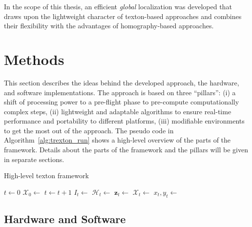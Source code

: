 \documentclass[11pt]{report}
\begin{document}
In the scope of this thesis, an efficient \emph{global} localization
was developed that draws upon the lightweight character of
texton-based approaches and combines their flexibility with the
advantages of homography-based approaches.

\chapter{Methods}
\label{chap:methods}

This section describes the ideas behind the developed approach, the
hardware, and software implementations.
The approach is based on three ``pillars'': (i) a shift of processing
power to a pre-flight phase to pre-compute computationally complex
steps, (ii) lightweight and adaptable algorithms to ensure real-time
performance and portability to different platforms, (iii) modifiable
environments to get the most out of the approach. The pseudo code in
Algorithm~\ref{alg:trexton_run} shows a high-level overview of the
parts of the framework. Details about the parts of the framework and
the pillars will be given in separate sections.
\begin{algorithm}
    \caption{High-level texton framework}
    \label{alg:trexton_run}
    \begin{algorithmic}[1]
      \State $t \gets 0$
      \State $\mathcal{X}_0 \gets$ 
       \State $t \gets t+1$ \State
      $I_t \gets$  \State
      $\mathcal{H}_t \gets$ 
      \State $\mathbf{z}_t \gets$
      \State $\mathcal{X}_t \gets$
      \State $x_t, y_t \gets$ 
      \EndProcedure
    \end{algorithmic}
  \end{algorithm}  
\section{Hardware and Software}
\label{sec:hardware}
\end{document}
